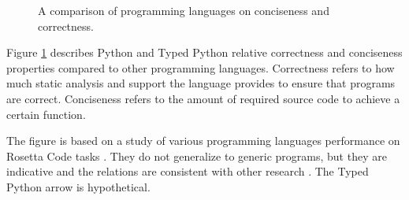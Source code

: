 \begin{figure}[ht]
    \centering
    \caption{A comparison of programming languages on conciseness and correctness.}
    \label{fig:language_comparison}
\end{figure}

Figure \ref{fig:language_comparison} describes Python and Typed Python relative correctness and conciseness properties compared to other programming languages. Correctness refers to how much static analysis and support the language provides to ensure that programs are correct. Conciseness refers to the amount of required source code to achieve a certain function.

The figure is based on a study of various programming languages performance on Rosetta Code tasks \cite{nanz_comparative_2015}. They do not generalize to generic programs, but they are indicative and the relations are consistent with other research \cite{ray_codequality_2014}. The Typed Python arrow is hypothetical.
